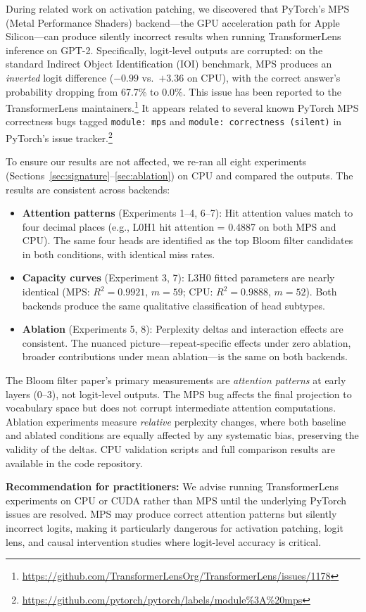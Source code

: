 \documentclass[11pt]{article}
\begin{document}
During related work on activation patching, we discovered that PyTorch's MPS (Metal Performance Shaders) backend---the GPU acceleration path for Apple Silicon---can produce silently incorrect results when running TransformerLens inference on GPT-2. Specifically, logit-level outputs are corrupted: on the standard Indirect Object Identification (IOI) benchmark, MPS produces an \emph{inverted} logit difference ($-0.99$ vs.\ $+3.36$ on CPU), with the correct answer's probability dropping from 67.7\% to 0.0\%. This issue has been reported to the TransformerLens maintainers.\footnote{\url{https://github.com/TransformerLensOrg/TransformerLens/issues/1178}} It appears related to several known PyTorch MPS correctness bugs tagged \texttt{module: mps} and \texttt{module: correctness (silent)} in PyTorch's issue tracker.\footnote{\url{https://github.com/pytorch/pytorch/labels/module\%3A\%20mps}}

To ensure our results are not affected, we re-ran all eight experiments (Sections~\ref{sec:signature}--\ref{sec:ablation}) on CPU and compared the outputs. The results are consistent across backends:

\begin{itemize}
    \item \textbf{Attention patterns} (Experiments 1--4, 6--7): Hit attention values match to four decimal places (e.g., L0H1 hit attention = 0.4887 on both MPS and CPU). The same four heads are identified as the top Bloom filter candidates in both conditions, with identical miss rates.
    \item \textbf{Capacity curves} (Experiment 3, 7): L3H0 fitted parameters are nearly identical (MPS: $R^2 = 0.9921$, $m = 59$; CPU: $R^2 = 0.9888$, $m = 52$). Both backends produce the same qualitative classification of head subtypes.
    \item \textbf{Ablation} (Experiments 5, 8): Perplexity deltas and interaction effects are consistent. The nuanced picture---repeat-specific effects under zero ablation, broader contributions under mean ablation---is the same on both backends.
\end{itemize}

The Bloom filter paper's primary measurements are \emph{attention patterns} at early layers (0--3), not logit-level outputs. The MPS bug affects the final projection to vocabulary space but does not corrupt intermediate attention computations. Ablation experiments measure \emph{relative} perplexity changes, where both baseline and ablated conditions are equally affected by any systematic bias, preserving the validity of the deltas. CPU validation scripts and full comparison results are available in the code repository.

\textbf{Recommendation for practitioners:} We advise running TransformerLens experiments on CPU or CUDA rather than MPS until the underlying PyTorch issues are resolved. MPS may produce correct attention patterns but silently incorrect logits, making it particularly dangerous for activation patching, logit lens, and causal intervention studies where logit-level accuracy is critical.
\end{document}
